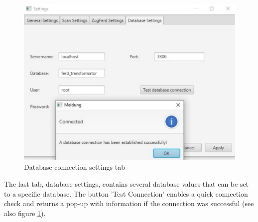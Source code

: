 \begin{figure}[ht!]
\centering
\includegraphics[scale=0.6,natwidth=210,natheight=156]{Images/GUI/settings_Database.pdf}
\caption{Database connection settings tab \label{settings_Database}}
\end{figure}

The last tab, database settings, contains several database values that can be set to a specific database. The button 'Test Connection' enables a quick connection check and returns a pop-up with information if the connection was successful (see also figure \ref{settings_Database}). 
